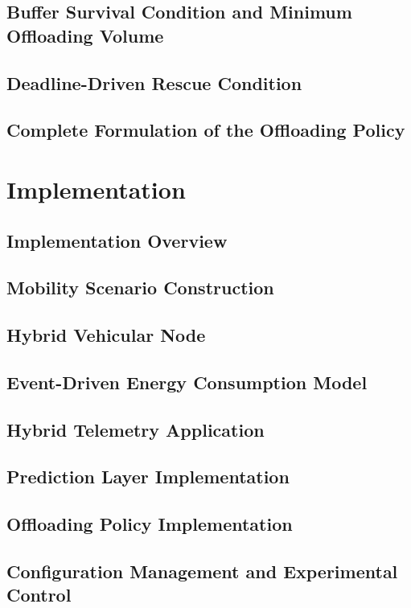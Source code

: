 \section{Buffer Survival Condition and Minimum Offloading Volume}
\section{Deadline-Driven Rescue Condition}
\section{Complete Formulation of the Offloading Policy}


\chapter{Implementation}

\section{Implementation Overview}
\section{Mobility Scenario Construction}
\section{Hybrid Vehicular Node}
\section{Event-Driven Energy Consumption Model}
\section{Hybrid Telemetry Application}
\section{Prediction Layer Implementation}
\section{Offloading Policy Implementation}
\section{Configuration Management and Experimental Control}
